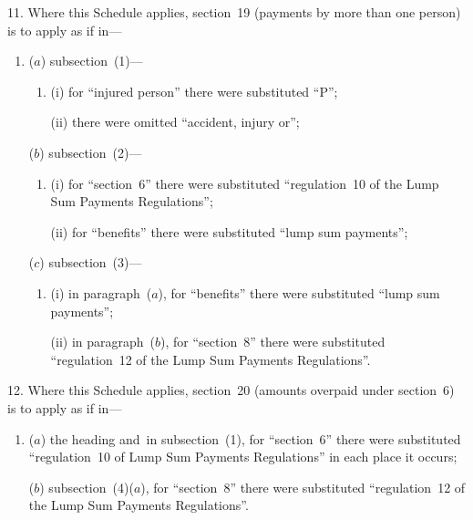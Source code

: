 \documentclass[12pt,a4paper]{article}
\begin{document}
11.  Where this Schedule applies, section~19 (payments by more than one person) is to apply as if in—
\begin{enumerate}\item[]
($a$) subsection~(1)—
\begin{enumerate}\item[]
(i) for “injured person” there were substituted “P”;

(ii) there were omitted “accident, injury or”;
\end{enumerate}

($b$) subsection~(2)—
\begin{enumerate}\item[]
(i) for “section~6” there were substituted “regulation~10 of the Lump Sum Payments Regulations”;

(ii) for “benefits” there were substituted “lump sum payments”;
\end{enumerate}

($c$) subsection~(3)—
\begin{enumerate}\item[]
(i) in paragraph~($a$), for “benefits” there were substituted “lump sum payments”;

(ii) in paragraph~($b$), for “section~8” there were substituted “regulation~12 of the Lump Sum Payments Regulations”.
\end{enumerate}
\end{enumerate}

\medskip

12.  Where this Schedule applies, section~20 (amounts overpaid under section~6) is to apply as if in—
\begin{enumerate}\item[]
($a$) the heading and~in subsection~(1), for “section~6” there were substituted “regulation~10 of Lump Sum Payments Regulations” in each place it occurs;

($b$) subsection~(4)($a$), for “section~8” there were substituted “regulation~12 of the Lump Sum Payments Regulations”.
\end{enumerate}

\medskip
\end{document}
